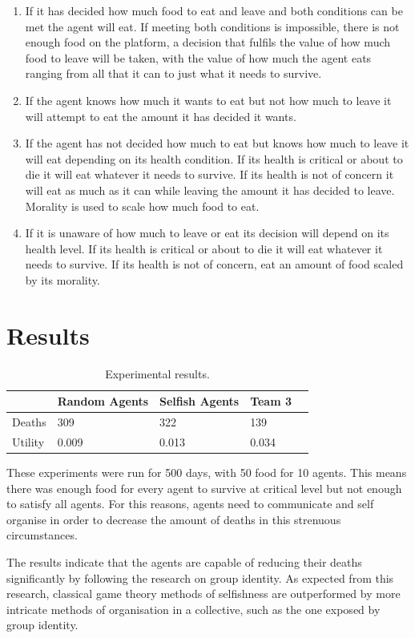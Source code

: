 \begin{enumerate}
    \item If it has decided how much food to eat and leave and both conditions can be met the agent will eat. If meeting both conditions is impossible, there is not enough food on the platform, a decision that fulfils the value of how much food to leave will be taken, with the value of how much the agent eats ranging from all that it can to just what it needs to survive. 
    \item If the agent knows how much it wants to eat but not how much to leave it will attempt to eat the amount it has decided it wants.
    \item If the agent has not decided how much to eat but knows how much to leave it will eat depending on its health condition. If its health is critical or about to die it will eat whatever it needs to survive. If its health is not of concern it will eat as much as it can while leaving the amount it has decided to leave. Morality is used to scale how much food to eat.
    \item If it is unaware of how much to leave or eat its decision will depend on its health level. If its health is critical or about to die it will eat whatever it needs to survive. If its health is not of concern, eat an amount of food scaled by its morality.
\end{enumerate}

\section{Results}
\begin{table}[htb]
    \centering
    \begin{tabular}{@{}lllll@{}}
    \toprule
        ~                       & Random Agents         & Selfish Agents         & Team 3                \\ \hline
        Deaths                  & 309                   & 322                    & 139                   \\ \hline
        Utility                 & 0.009                 & 0.013                  & 0.034                 \\ \hline
    \end{tabular}
    \caption{Experimental results.}
\end{table}
These experiments were run for 500 days, with 50 food for 10 agents. This means there was enough food for every agent to survive at critical level but not enough to satisfy all agents. For this reasons, agents need to communicate and self organise in order to decrease the amount of deaths in this strenuous circumstances.\par 
The results indicate that the agents are capable of reducing their deaths significantly by following the research on group identity. As expected from this research,  classical game theory methods of selfishness are outperformed by more intricate methods of organisation in a collective, such as the one exposed by group identity.\par
